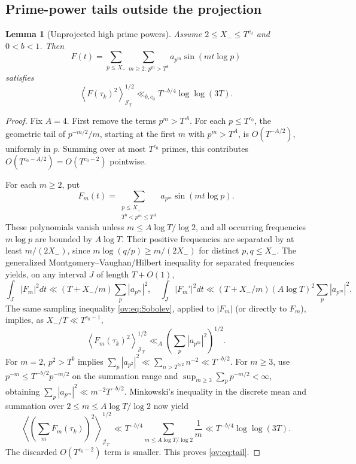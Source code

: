\documentclass[11pt,reqno]{amsart}
\numberwithin{equation}{section}
\newtheorem{lemma}[theorem]{Lemma}
\newcommand{\avgJ}[1]{\left\langle #1\right\rangle_{\mathcal J_T}}
\begin{document}
\subsection{Prime-power tails outside the projection}
\begin{lemma}[Unprojected high prime powers]\label{ov:lem:tail}
Assume $2\le X_-\le T^{c_0}$ and $0<b<1$. Then
\begin{equation}
F(t)=\sum_{p\le X_-}\sum_{m\ge2:\,p^m>T^b}a_{p^m}\sin(mt\log p)
\end{equation}
satisfies
\begin{equation}
\avgJ{F(\tau_k)^2}^{1/2}\ll_{b,c_0}T^{-b/4}\log\log(3T).
\label{ov:eq:tail}
\end{equation}
\end{lemma}
\begin{proof}
Fix $A=4$. First remove the terms $p^m>T^A$. For each $p\le T^{c_0}$, the geometric tail of $p^{-m/2}/m$, starting at the first $m$ with $p^m>T^A$, is $O(T^{-A/2})$, uniformly in $p$. Summing over at most $T^{c_0}$ primes, this contributes $O(T^{c_0-A/2})=O(T^{c_0-2})$ pointwise.

For each $m\ge2$, put
\[F_m(t)=\sum_{\substack{p\le X_-\\T^b<p^m\le T^A}}a_{p^m}\sin(mt\log p).\]
These polynomials vanish unless $m\le A\log T/\log2$, and all occurring frequencies $m\log p$ are bounded by $A\log T$. Their positive frequencies are separated by at least $m/(2X_-)$, since $m\log(q/p)\ge m/(2X_-)$ for distinct $p,q\le X_-$. The generalized Montgomery--Vaughan/Hilbert inequality for separated frequencies yields, on any interval $J$ of length $T+O(1)$,
\begin{equation}
\int_J|F_m|^2dt\ll(T+X_-/m)\sum_p|a_{p^m}|^2,
\quad
\int_J|F_m'|^2dt\ll(T+X_-/m)(A\log T)^2\sum_p|a_{p^m}|^2.
\label{ov:eq:MV}
\end{equation}
The same sampling inequality \eqref{ov:eq:Sobolev}, applied to $|F_m|$ (or directly to $F_m$), implies, as $X_-/T\ll T^{c_0-1}$,
\begin{equation}
\avgJ{F_m(\tau_k)^2}^{1/2}\ll_A \left(\sum_p|a_{p^m}|^2\right)^{1/2}.
\label{ov:eq:Fsamp}
\end{equation}
For $m=2$, $p^2>T^b$ implies
$\sum_p|a_{p^2}|^2\ll\sum_{n>T^{b/2}}n^{-2}\ll T^{-b/2}$. For $m\ge3$, use $p^{-m}\le T^{-b/2}p^{-m/2}$ on the summation range and
$\sup_{m\ge3}\sum_p p^{-m/2}<\infty$, obtaining
$\sum_p|a_{p^m}|^2\ll m^{-2}T^{-b/2}$.
Minkowski's inequality in the discrete mean and summation over $2\le m\le A\log T/\log2$ now yield
\[\avgJ{(\sum_mF_m(\tau_k))^2}^{1/2}
\ll T^{-b/4}\sum_{m\le A\log T/\log2}\frac1m
\ll T^{-b/4}\log\log(3T).\]
The discarded $O(T^{c_0-2})$ term is smaller. This proves \eqref{ov:eq:tail}.
\end{proof}
\end{document}
